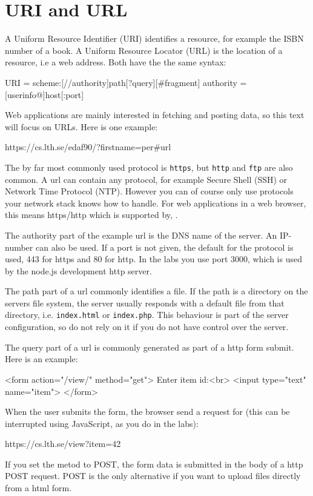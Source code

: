 \section{URI and URL} \label{section:url}
A Uniform Resource Identifier (URI) identifies a resource, for example the ISBN number of a book. A Uniform Resource Locator (URL) is the location of a resource, i.e a web address. Both have the the same syntax:
\begin{Code}
URI = scheme:[//authority]path[?query][#fragment]
authority = [userinfo@]host[:port]
\end{Code}
Web applications are mainly interested in fetching and posting data, so this text will focus on URLs. Here is one example:
\begin{Code}
https://cs.lth.se/edaf90/?firstname=per#url
\end{Code}
The by far most commonly used protocol is \texttt{https}, but \texttt{http} and \texttt{ftp} are also common.  A url can contain any protocol, for example Secure Shell (SSH) or Network Time Protocol (NTP). However you can of course only use protocols your network stack knows how to handle. For web applications in a web browser, this means https/http which is supported by, . 

The authority part of the example url is the DNS name of the server. An IP-number can also be used. If a port is not given, the default for the protocol is used, 443 for https and 80 for http. In the labs you use port 3000, which is used by the node.js development http server.

The path part of a url commonly identifies a file. If the path is a directory on the servers file system, the server usually responds with a default file from that directory, i.e. \texttt{index.html} or \texttt{index.php}. This behaviour is part of the server configuration, so do not rely on it if you do not have control over the server. 

The query part of a url is commonly generated as part of a http form submit. Here is an example:
\begin{Code}
<form action="/view/" method="get">
  Enter item id:<br>
  <input type="text" name="item">
</form>
\end{Code}
When the user submits the form, the browser send a request for (this can be interrupted using JavaScript, as you do in the labs):
\begin{Code}
https://cs.lth.se/view?item=42
\end{Code}
If you set the metod to POST, the form data is submitted in the body of a http POST request. POST is the only alternative if you want to upload files directly from a html form.

